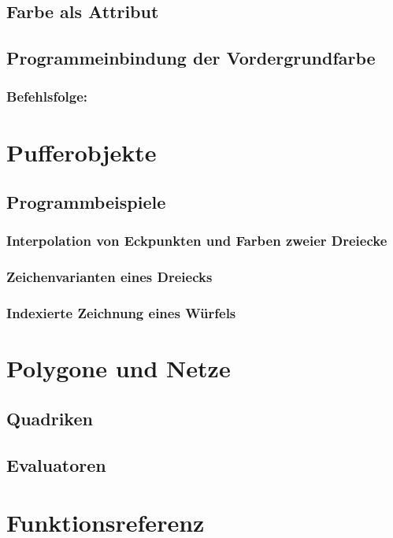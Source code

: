 \subsection{Farbe als Attribut}
\subsection{Programmeinbindung der Vordergrundfarbe}
\subsubsection*{Befehlsfolge:}

\section{Pufferobjekte}
\subsection{Programmbeispiele}
\subsubsection*{Interpolation von Eckpunkten und Farben zweier Dreiecke}
\subsubsection*{Zeichenvarianten eines Dreiecks}
\subsubsection*{Indexierte Zeichnung eines Würfels}

\section{Polygone und Netze}
\subsection{Quadriken}
\subsection{Evaluatoren}

\section{Funktionsreferenz}

